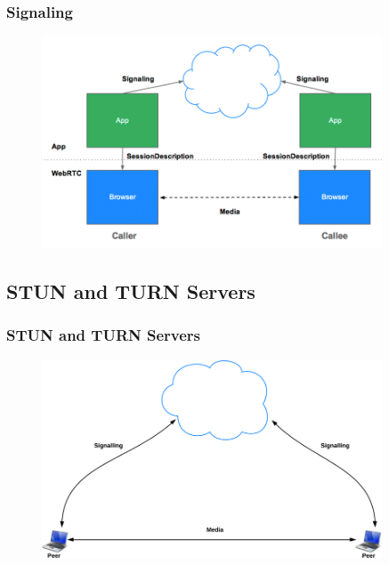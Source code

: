 \documentclass{beamer}
\begin{document}
\begin{frame}[c]\frametitle{Signaling}

\begin{figure}
\centering
\includegraphics[width=0.9\textwidth]{images/jsep}
\end{figure}

\end{frame}

\subsection{STUN and TURN Servers}

\begin{frame}[t]\frametitle{STUN and TURN Servers}
\begin{figure}
\centering
\includegraphics[keepaspectratio=true, width=0.9\textwidth]{images/noSTUNorTURN}
\end{figure}
\end{frame}
\end{document}
